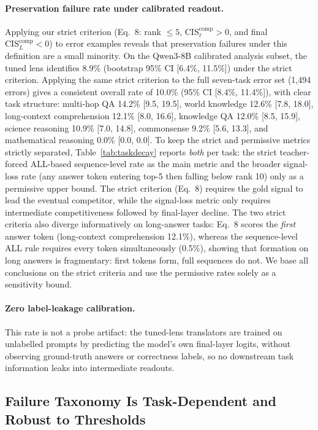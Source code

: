 \documentclass{article} %
\begin{document}
\paragraph{Preservation failure rate under calibrated readout.}
Applying our strict criterion (Eq.~8: rank $\le 5$, $\mathrm{CIS}^{\mathrm{comp}}_\ell > 0$, and final $\mathrm{CIS}^{\mathrm{comp}}_L < 0$) to error examples reveals that preservation failures under this definition are a small minority. On the Qwen3-8B calibrated analysis subset, the tuned lens identifies 8.9\% (bootstrap 95\% CI [6.4\%, 11.5\%]) under the strict criterion. Applying the same strict criterion to the full seven-task error set (1{,}494 errors) gives a consistent overall rate of 10.0\% (95\% CI [8.4\%, 11.4\%]), with clear task structure: multi-hop QA 14.2\% [9.5, 19.5], world knowledge 12.6\% [7.8, 18.0], long-context comprehension 12.1\% [8.0, 16.6], knowledge QA 12.0\% [8.5, 15.9], science reasoning 10.9\% [7.0, 14.8], commonsense 9.2\% [5.6, 13.3], and mathematical reasoning 0.0\% [0.0, 0.0]. To keep the strict and permissive metrics strictly separated, Table~\ref{tab:taskdecay} reports \emph{both} per task: the strict teacher-forced ALL-based sequence-level rate as the main metric and the broader signal-loss rate (any answer token entering top-5 then falling below rank 10) only as a permissive upper bound. The strict criterion (Eq.~8) requires the gold signal to lead the eventual competitor, while the signal-loss metric only requires intermediate competitiveness followed by final-layer decline. The two strict criteria also diverge informatively on long-answer tasks: Eq.~8 scores the \emph{first} answer token (long-context comprehension 12.1\%), whereas the sequence-level ALL rule requires every token simultaneously (0.5\%), showing that formation on long answers is fragmentary: first tokens form, full sequences do not. We base all conclusions on the strict criteria and use the permissive rates solely as a sensitivity bound.

\paragraph{Zero label-leakage calibration.}
This rate is not a probe artifact: the tuned-lens translators are trained on unlabelled prompts by predicting the model's own final-layer logits, without observing ground-truth answers or correctness labels, so no downstream task information leaks into intermediate readouts.

\subsection{Failure Taxonomy Is Task-Dependent and Robust to Thresholds}
\label{sec:taskdecay}
\end{document}
